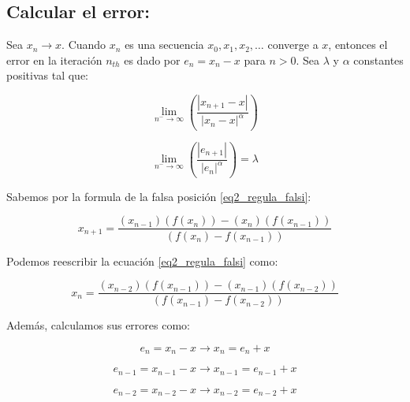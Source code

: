 
\subsection{Calcular el error:}

Sea $ {x_n} \rightarrow x $. Cuando $ x_n $ es una secuencia $ {x_0,x_1,x_2,\ldots} $ converge a $ x $, entonces el error en la iteración $ n_{th} $ es dado por $ e_n = x_n - x $ para $ n > 0 $.\newline\newline
Sea $ \lambda $ y $ \alpha $ constantes positivas tal que:

\begin{displaymath}
    \lim_{n^{-} \to \infty} (\frac{|x_{n+1} - x|}{|x_n - x|^\alpha})
\end{displaymath}

\begin{displaymath}
    \lim_{n^{-} \to \infty} (\frac{|e_{n+1}|}{|e_n|^\alpha}) = \lambda
\end{displaymath}

Sabemos por la formula de la falsa posición \eqref{eq2_regula_falsi}:

\begin{displaymath}
    x_{n+1} = \frac{(x_{n-1})(f(x_n)) - (x_n)(f(x_{n-1}))}{(f(x_n) - f(x_{n-1}))}
\end{displaymath}

Podemos reescribir la ecuación \eqref{eq2_regula_falsi} como:

\begin{equation}
    \label{eq3_regula_falsi}
    x_n = \frac{(x_{n-2})(f(x_{n-1})) - (x_{n-1})(f(x_{n-2}))}{(f(x_{n-1}) - f(x_{n-2}))}
\end{equation}

Además, calculamos sus errores como:

\begin{equation}
    \label{eq4_regula_falsi}
    e_n = x_n - x \rightarrow x_n = e_n + x
\end{equation}

\begin{equation}
    \label{eq5_regula_falsi}
    e_{n-1} = x_{n-1} - x \rightarrow x_{n-1} = e_{n-1} + x
\end{equation}

\begin{equation}
    \label{eq6_regula_falsi}
    e_{n-2} = x_{n-2} - x \rightarrow x_{n-2} = e_{n-2} + x
\end{equation}

